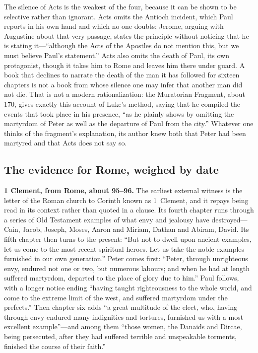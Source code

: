 The silence of Acts is the weakest of the four, because it can be shown to
be selective rather than ignorant. Acts omits the Antioch incident, which
Paul reports in his own hand and which no one doubts; Jerome, arguing with
Augustine about that very passage, states the principle without noticing that
he is stating it---``although the Acts of the Apostles do not mention this,
but we must believe Paul's statement.'' Acts also omits the death of Paul,
its own protagonist, though it takes him to Rome and leaves him there under
guard. A book that declines to narrate the death of the man it has followed
for sixteen chapters is not a book from whose silence one may infer that
another man did not die. That is not a modern rationalization: the Muratorian
Fragment, about 170, gives exactly this account of Luke's method, saying that
he compiled the events that took place in his presence, ``as he plainly shows
by omitting the martyrdom of Peter as well as the departure of Paul from the
city.'' Whatever one thinks of the fragment's explanation, its author knew
both that Peter had been martyred and that Acts does not say so.

\subsection{The evidence for Rome, weighed by date}

\textbf{1 Clement, from Rome, about 95--96.} The earliest external witness is
the letter of the Roman church to Corinth known as 1~Clement, and it repays
being read in its context rather than quoted in a clause. Its fourth chapter
runs through a series of Old Testament examples of what envy and jealousy
have destroyed---Cain, Jacob, Joseph, Moses, Aaron and Miriam, Dathan and
Abiram, David. Its fifth chapter then turns to the present: ``But not to
dwell upon ancient examples, let us come to the most recent spiritual heroes.
Let us take the noble examples furnished in our own generation.'' Peter comes
first: ``Peter, through unrighteous envy, endured not one or two, but
numerous labours; and when he had at length suffered martyrdom, departed to
the place of glory due to him.'' Paul follows, with a longer notice ending
``having taught righteousness to the whole world, and come to the extreme
limit of the west, and suffered martyrdom under the prefects.'' Then chapter
six adds ``a great multitude of the elect, who, having through envy endured
many indignities and tortures, furnished us with a most excellent example''---and among them ``those women, the Danaids and Dircae, being persecuted, after
they had suffered terrible and unspeakable torments, finished the course of
their faith.''

